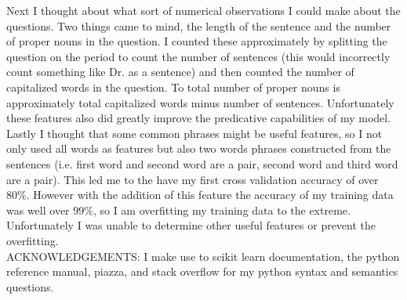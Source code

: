 \documentclass[110pt, oneside]{article}   	%
\begin{document}
Next I thought about what sort of numerical observations I could make about the questions.  Two things came to mind, the length of the sentence and the number of proper nouns in the question.  I counted these approximately by splitting the question on the period to count the number of sentences (this would incorrectly count something like Dr. as a sentence) and then counted the number of capitalized words in the question.  To total number of proper nouns is approximately total capitalized words minus number of sentences.  Unfortunately these features also did greatly improve the predicative capabilities of my model. \\

Lastly I thought that some common phrases might be useful features, so I not only used all words as features but also two words phrases constructed from the sentences (i.e. first word and second word are a pair, second word and third word are a pair).  This led me to the have my first cross validation accuracy of over $80\%$.  However with the addition of this feature the accuracy of my training data was well over $99\%$, so I am overfitting my training data to the extreme.  Unfortunately I was unable to determine other useful features or prevent the overfitting.\\

ACKNOWLEDGEMENTS: I make use to scikit learn documentation, the python reference manual, piazza, and stack overflow for my python syntax and semantics questions.
\end{document}
